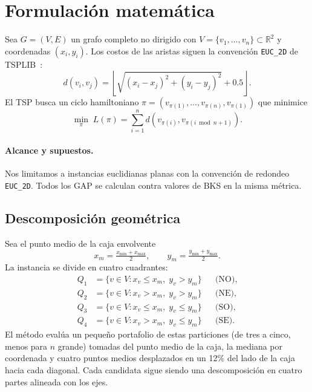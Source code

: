 \documentclass[runningheads]{llncs}
\begin{document}
\section{Formulación matemática}
\label{sec:formulation}

Sea $G=(V,E)$ un grafo completo no dirigido con
$V=\{v_1,\dots,v_n\}\subset\mathbb{R}^2$ y coordenadas $(x_i,y_i)$.
Los costos de las aristas siguen la convención \texttt{EUC\_2D} de
TSPLIB~\cite{reinelt1991tsplib}:
\begin{equation}
 d(v_i,v_j)=\left\lfloor\sqrt{(x_i-x_j)^2+(y_i-y_j)^2}+0.5\right\rfloor.
 \label{eq:dist}
\end{equation}
El TSP busca un ciclo hamiltoniano
$\pi=(v_{\pi(1)},\dots,v_{\pi(n)},v_{\pi(1)})$ que minimice
\begin{equation}
 \min_{\pi}\;L(\pi)=\sum_{i=1}^{n}
 d\!\left(v_{\pi(i)},v_{\pi(i\bmod n+1)}\right).
 \label{eq:tsp}
\end{equation}

\paragraph{Alcance y supuestos.}
Nos limitamos a instancias euclidianas planas con la convención de
redondeo \texttt{EUC\_2D}. Todos los GAP se calculan contra valores de
BKS en la misma métrica.

\subsection{Descomposición geométrica}

Sea el punto medio de la caja envolvente
\begin{equation}
 x_m=\tfrac{x_{\min}+x_{\max}}{2}, \qquad
 y_m=\tfrac{y_{\min}+y_{\max}}{2}.
\end{equation}
La instancia se divide en cuatro cuadrantes:
\begin{align}
Q_1&=\{v\in V: x_v\le x_m,\; y_v>y_m\}  &&\text{(NO)},\\
Q_2&=\{v\in V: x_v>x_m,\; y_v>y_m\}    &&\text{(NE)},\\
Q_3&=\{v\in V: x_v\le x_m,\; y_v\le y_m\}&&\text{(SO)},\\
Q_4&=\{v\in V: x_v>x_m,\; y_v\le y_m\} &&\text{(SE)}.
\end{align}
El método evalúa un pequeño portafolio de estas particiones (de tres a
cinco, menos para $n$ grande) tomadas del punto medio de la caja, la
mediana por coordenada y cuatro puntos medios desplazados en un 12\% del
lado de la caja hacia cada diagonal. Cada candidata sigue siendo una
descomposición en cuatro partes alineada con los ejes.
\end{document}

